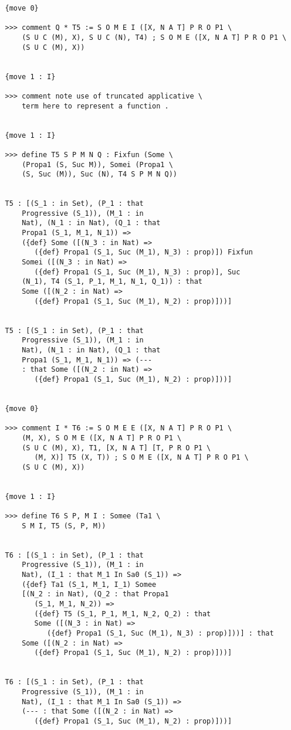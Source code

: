 \documentclass{article}
\begin{document}
\begin{verbatim}
   {move 0}

   >>> comment Q * T5 := S O M E I ([X, N A T] P R O P1 \
       (S U C (M), X), S U C (N), T4) ; S O M E ([X, N A T] P R O P1 \
       (S U C (M), X))


   {move 1 : I}

   >>> comment note use of truncated applicative \
       term here to represent a function .


   {move 1 : I}

   >>> define T5 S P M N Q : Fixfun (Some \
       (Propa1 (S, Suc M)), Somei (Propa1 \
       (S, Suc (M)), Suc (N), T4 S P M N Q))


   T5 : [(S_1 : in Set), (P_1 : that 
       Progressive (S_1)), (M_1 : in 
       Nat), (N_1 : in Nat), (Q_1 : that 
       Propa1 (S_1, M_1, N_1)) => 
       ({def} Some ([(N_3 : in Nat) => 
          ({def} Propa1 (S_1, Suc (M_1), N_3) : prop)]) Fixfun 
       Somei ([(N_3 : in Nat) => 
          ({def} Propa1 (S_1, Suc (M_1), N_3) : prop)], Suc 
       (N_1), T4 (S_1, P_1, M_1, N_1, Q_1)) : that 
       Some ([(N_2 : in Nat) => 
          ({def} Propa1 (S_1, Suc (M_1), N_2) : prop)]))]


   T5 : [(S_1 : in Set), (P_1 : that 
       Progressive (S_1)), (M_1 : in 
       Nat), (N_1 : in Nat), (Q_1 : that 
       Propa1 (S_1, M_1, N_1)) => (--- 
       : that Some ([(N_2 : in Nat) => 
          ({def} Propa1 (S_1, Suc (M_1), N_2) : prop)]))]


   {move 0}

   >>> comment I * T6 := S O M E E ([X, N A T] P R O P1 \
       (M, X), S O M E ([X, N A T] P R O P1 \
       (S U C (M), X), T1, [X, N A T] [T, P R O P1 \
          (M, X)] T5 (X, T)) ; S O M E ([X, N A T] P R O P1 \
       (S U C (M), X))


   {move 1 : I}

   >>> define T6 S P, M I : Somee (Ta1 \
       S M I, T5 (S, P, M))


   T6 : [(S_1 : in Set), (P_1 : that 
       Progressive (S_1)), (M_1 : in 
       Nat), (I_1 : that M_1 In Sa0 (S_1)) => 
       ({def} Ta1 (S_1, M_1, I_1) Somee 
       [(N_2 : in Nat), (Q_2 : that Propa1 
          (S_1, M_1, N_2)) => 
          ({def} T5 (S_1, P_1, M_1, N_2, Q_2) : that 
          Some ([(N_3 : in Nat) => 
             ({def} Propa1 (S_1, Suc (M_1), N_3) : prop)]))] : that 
       Some ([(N_2 : in Nat) => 
          ({def} Propa1 (S_1, Suc (M_1), N_2) : prop)]))]


   T6 : [(S_1 : in Set), (P_1 : that 
       Progressive (S_1)), (M_1 : in 
       Nat), (I_1 : that M_1 In Sa0 (S_1)) => 
       (--- : that Some ([(N_2 : in Nat) => 
          ({def} Propa1 (S_1, Suc (M_1), N_2) : prop)]))]



\end{verbatim}
\end{document}
